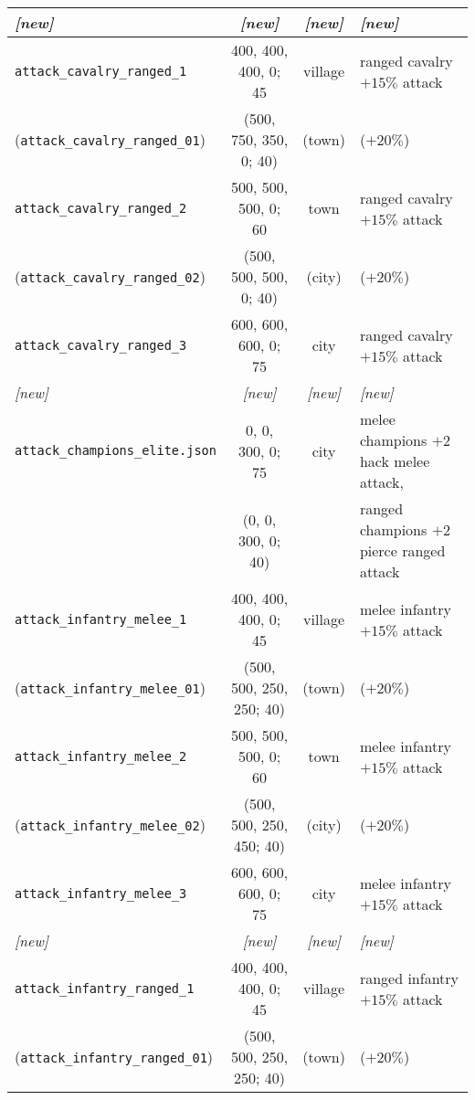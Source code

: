 \documentclass{article}
\begin{document}
\begin{tabular}{l|cc|l}
\emph{[new]} & \emph{[new]} & \emph{[new]} & \emph{[new]} \\
\hline
\verb+attack_cavalry_ranged_1+               &   400,  400,  400,    0;  45  & village    & ranged cavalry $+15\%$ attack \\
(\verb+attack_cavalry_ranged_01+)            &  (500,  750,  350,    0;  40) & (town)     & ($+20\%$) \\
\hline
\verb+attack_cavalry_ranged_2+               &   500,  500,  500,    0;  60  & town       & ranged cavalry $+15\%$ attack \\
(\verb+attack_cavalry_ranged_02+)            &  (500,  500,  500,    0;  40) & (city)     & ($+20\%$) \\
\hline
\verb+attack_cavalry_ranged_3+               &   600,  600,  600,    0;  75  & city       & ranged cavalry $+15\%$ attack \\
\emph{[new]} & \emph{[new]} & \emph{[new]} & \emph{[new]} \\
\hline
\verb+attack_champions_elite.json+           &     0,    0,  300,    0;  75  & city       & melee champions $+2$ hack melee attack, \\
                                             &    (0,    0,  300,    0;  40) &            & ranged champions $+2$ pierce ranged attack \\
\hline
\verb+attack_infantry_melee_1+               &   400,  400,  400,    0;  45  & village    & melee infantry $+15\%$ attack \\
(\verb+attack_infantry_melee_01+)            &  (500,  500,  250,  250;  40) & (town)     & ($+20\%$) \\
\hline
\verb+attack_infantry_melee_2+               &   500,  500,  500,    0;  60  & town       & melee infantry $+15\%$ attack \\
(\verb+attack_infantry_melee_02+)            &  (500,  500,  250,  450;  40) & (city)     & ($+20\%$) \\
\hline
\verb+attack_infantry_melee_3+               &   600,  600,  600,    0;  75  & city       & melee infantry $+15\%$ attack \\
\emph{[new]} & \emph{[new]} & \emph{[new]} & \emph{[new]} \\
\hline
\verb+attack_infantry_ranged_1+              &   400,  400,  400,    0;  45  & village    & ranged infantry $+15\%$ attack \\
(\verb+attack_infantry_ranged_01+)           &  (500,  500,  250,  250;  40) & (town)     & ($+20\%$) \\
\hline

\end{tabular}
\end{document}
